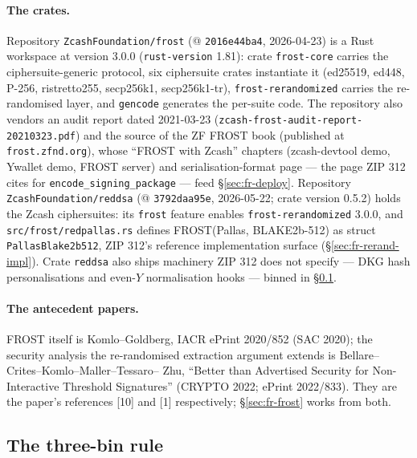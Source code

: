 \documentclass[11pt,a4paper]{article}
\theoremstyle{definition}
\begin{document}
\paragraph{The crates.} Repository \texttt{ZcashFoundation/frost}
(@ \texttt{2016e44ba4}, 2026-04-23) is a Rust workspace at version 3.0.0
(\texttt{rust-version} 1.81): crate \texttt{frost-core} carries the
ciphersuite-generic protocol, six ciphersuite crates instantiate it
(ed25519, ed448, P-256, ristretto255, secp256k1, secp256k1-tr),
\texttt{frost-rerandomized} carries the re-randomised layer, and
\texttt{gencode} generates the per-suite code. The repository also
vendors an audit report dated 2021-03-23
(\texttt{zcash-frost-audit-report-20210323.pdf}) and the source of the ZF
FROST book (published at \texttt{frost.zfnd.org}), whose ``FROST with
Zcash'' chapters (zcash-devtool demo, Ywallet demo, FROST server) and
serialisation-format page --- the page ZIP 312 cites for
\texttt{encode\_signing\_package} --- feed \S\ref{sec:fr-deploy}.
Repository \texttt{ZcashFoundation/reddsa} (@ \texttt{3792daa95e},
2026-05-22; crate version 0.5.2) holds the Zcash ciphersuites: its
\texttt{frost} feature enables \texttt{frost-rerandomized} 3.0.0, and
\texttt{src/frost/redpallas.rs} defines FROST(Pallas, BLAKE2b-512) as
struct \texttt{PallasBlake2b512}, ZIP 312's reference implementation
surface (\S\ref{sec:fr-rerand-impl}). Crate \texttt{reddsa} also ships
machinery ZIP 312 does not specify --- DKG hash personalisations and
even-$Y$ normalisation hooks --- binned in \S\ref{sec:fr-bins}.

\paragraph{The antecedent papers.} FROST itself is Komlo--Goldberg, IACR
ePrint 2020/852 (SAC 2020); the security analysis the re-randomised
extraction argument extends is Bellare--Crites--Komlo--Maller--Tessaro--%
Zhu, ``Better than Advertised Security for Non-Interactive Threshold
Signatures'' (CRYPTO 2022; ePrint 2022/833). They are the paper's
references [10] and [1] respectively; \S\ref{sec:fr-frost} works from
both.

\subsection{The three-bin rule}\label{sec:fr-bins}
\end{document}
